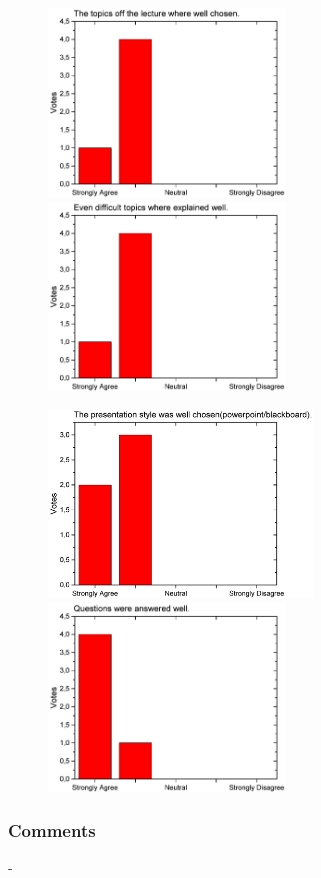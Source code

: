 \begin{figure}[H]
  \begin{minipage}{.48\linewidth}
    \centering
      {\includegraphics[height=50mm]{figures/n/Graph107.pdf}}
      {\includegraphics[height=50mm]{figures/n/Graph108.pdf}}
  \end{minipage}\quad
  \begin{minipage}{.48\linewidth}
    \centering
      {\includegraphics[height=50mm]{figures/n/Graph109.pdf}}
      {\includegraphics[height=50mm]{figures/n/Graph110.pdf}}
  \end{minipage}
\end{figure}
\subsubsection*{Comments}
-
\newpage